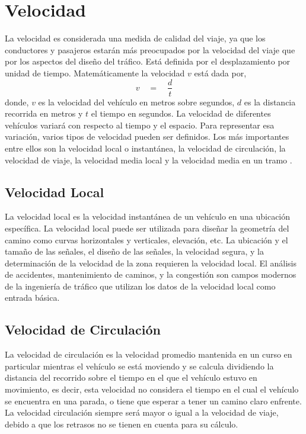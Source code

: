 \section{Velocidad}

La velocidad es considerada una medida de calidad del viaje, ya que los conductores y pasajeros estarán más preocupados por la velocidad del viaje que por los aspectos del diseño del tráfico. Está definida por el desplazamiento por unidad de tiempo. Matemáticamente la velocidad $v$ está dada por,
\begin{equation}
v\quad =\quad \frac { d }{ t }
\end{equation}
donde, $v$ es la velocidad del vehículo en metros sobre segundos, $d$ es la distancia recorrida en metros y $t$ el tiempo en segundos. La velocidad de diferentes vehículos variará con respecto al tiempo y el espacio. Para representar esa variación, varios tipos de velocidad pueden ser definidos. Los más importantes entre ellos son la velocidad local o instantánea, la velocidad de circulación, la velocidad de viaje, la velocidad media local y la velocidad media en un tramo \cite{may1990fundamentals}.

\subsection{Velocidad Local}

La velocidad local es la velocidad instantánea de un vehículo en una ubicación específica. La velocidad local puede ser utilizada para diseñar la geometría del camino como curvas horizontales y verticales, elevación, etc. La ubicación y el tamaño de las señales, el diseño de las señales, la velocidad segura, y la determinación de la velocidad de la zona requieren la velocidad local. El análisis de accidentes, mantenimiento de caminos, y la congestión son campos modernos de la ingeniería de tráfico que utilizan los datos de la velocidad local como entrada básica. 

\subsection{Velocidad de Circulación}

La velocidad de circulación es la velocidad promedio mantenida en un curso en particular mientras el vehículo se está moviendo y se calcula dividiendo la distancia del recorrido sobre el tiempo en el que el vehículo estuvo en movimiento, es decir, esta velocidad no considera el tiempo en el cual el vehículo se encuentra en una parada, o tiene que esperar a tener un camino claro enfrente. La velocidad circulación siempre será mayor o igual a la velocidad de viaje, debido a que los retrasos no se tienen en cuenta para su cálculo.

